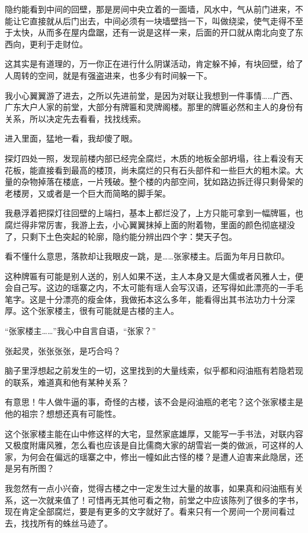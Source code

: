 隐约能看到中间的回壁，那是房间中央立着的一面墙，风水中，气从前门进来，不能让它直接就从后门出去，中间必须有一块墙壁挡一下，叫做绕梁，使气走得不至于太快，从而多在屋内盘踞，还有一说是这样一来，后面的开口就从南北向变了东西向，更利于走财位。

这其实是有道理的，万一你正在进行什么阴谋活动，肯定躲不掉，有块回壁，给了人周转的空间，就是有强盗进来，也多少有时间躲一下。

我小心翼翼游了进去，之所以先进前堂，是因为对联让我想到一件事情……广西、广东大户人家的前堂，大部分有牌匾和灵牌阁楼。那里的牌匾必然和主人的身份有关系，所以决定先去看看，找找线索。

进入里面，猛地一看，我却傻了眼。

探灯四处一照，发现前楼内部已经完全腐烂，木质的地板全部坍塌，往上看没有天花板，能直接看到最高的楼顶，尚未腐烂的只有石头部件和一些巨大的粗木梁。大量的杂物掉落在楼底，一片残破。整个楼的内部空间，犹如路边拆迁得只剩骨架的老楼房，又或者是一个巨大而简略的脚手架。

我悬浮着把探灯往回壁的上端扫，基本上都烂没了，上方只能可拿到一幅牌匾，也腐烂得非常厉害，我游上去，小心翼翼抹掉上面的附着物，里面的颜色彻底褪没了，只剩下土色突起的轮廓，隐约能分辨出四个字：樊天子包。

看不懂什么意思，落款却让我眼皮一跳，是……张家楼主。后面为年月日款印。

这种牌匾有可能是别人送的，别人如果不送，主人本身又是大儒或者风雅人士，便会自己写。这边的瑶寨之内，不太可能有瑶人会写汉语，还写得如此漂亮的一手毛笔字。这是十分漂亮的瘦金体，我做拓本这么多年，能看得出其书法功力十分深厚。这个张家楼主，很有可能就是古楼的主人。

“张家楼主……”我心中自言自语，“张家？”

张起灵，张张张张，是巧合吗？

脑子里浮想起之前发生的一切，这里找到的大量线索，似乎都和闷油瓶有若隐若现的联系，难道真和他有某种关系？

有意思！牛人做牛逼的事，奇怪的古楼，该不会是闷油瓶的老宅？这个张家楼主是他的祖宗？想想还真有可能性。

这个张家楼主能在山中修这样的大宅，显然家底雄厚，又能写一手书法，对联内容又极度附庸风雅，怎么看也应该是自比儒商大家的胡雪岩一类的做派，可这样的人家，为何会在偏远的瑶寨之中，修出一幢如此古怪的楼？是遭人迫害来此隐居，还是另有所图？

我忽然有一点小兴奋，觉得古楼之中一定发生过大量的故事，如果真和闷油瓶有关系，这一次就来值了！可惜再无其他可看之物，前堂之中应该陈列了很多的字书，现在肯定全部腐烂，要是有更多的文字就好了。看来只有一个房间一个房间看过去，找找所有的蛛丝马迹了。

